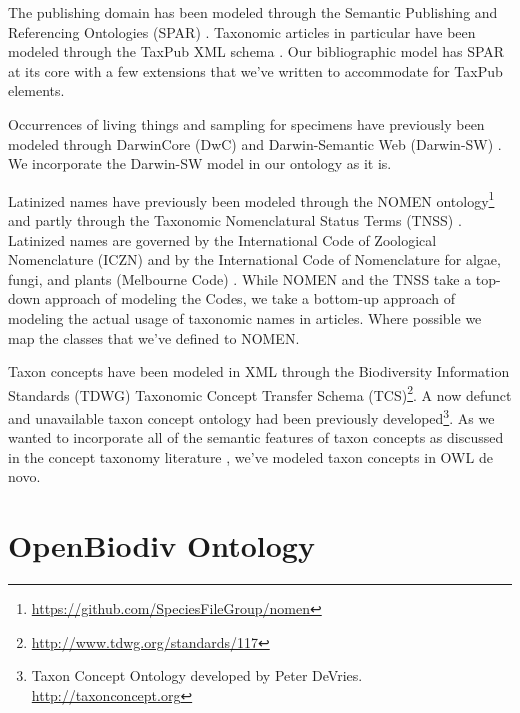 \documentclass{IOS-Book-Article}
\begin{document}
The publishing domain has been modeled through the Semantic Publishing and Referencing Ontologies (SPAR) \cite{r14}. Taxonomic articles in particular have been modeled through the TaxPub XML schema \cite{r13}. Our bibliographic model has SPAR at its core with a few extensions that we've written to accommodate for TaxPub elements.

Occurrences of living things and sampling for specimens have previously been modeled through DarwinCore (DwC) and Darwin-Semantic Web (Darwin-SW) \cite{r15, r16}. We incorporate the Darwin-SW model in our ontology as it is.

Latinized names have previously been modeled through the NOMEN ontology\footnote{\url{https://github.com/SpeciesFileGroup/nomen}} and partly through the Taxonomic Nomenclatural Status Terms (TNSS) \cite{r17}. Latinized names are governed by the International Code of Zoological Nomenclature (ICZN) \cite{r18} and by the International Code of Nomenclature for algae, fungi, and plants (Melbourne Code) \cite{r19}. While NOMEN and the TNSS take a top-down approach of modeling the Codes, we take a bottom-up approach of modeling the actual usage of taxonomic names in articles. Where possible we map the classes that we've defined to NOMEN.

Taxon concepts have been modeled in XML through the Biodiversity Information Standards (TDWG) Taxonomic Concept Transfer Schema (TCS)\footnote{\url{http://www.tdwg.org/standards/117}}. A now defunct and unavailable taxon concept ontology had been previously developed\footnote{Taxon {Concept} {Ontology} developed by Peter DeVries. \url{http://taxonconcept.org}}. As we wanted to incorporate all of the semantic features of taxon concepts as discussed in the concept taxonomy literature \cite{r12, r20, r21}, we've modeled taxon concepts in OWL de novo.


\section{OpenBiodiv Ontology}
\end{document}
